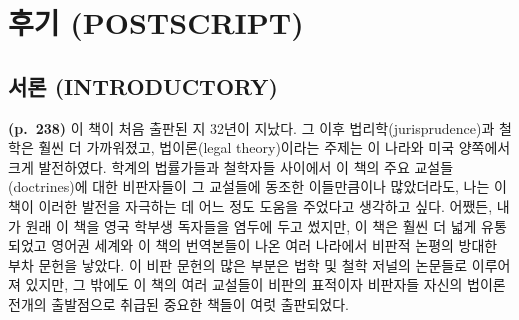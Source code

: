 \section{후기 (POSTSCRIPT)}\label{uxd6c4uxae30-postscript}

\subsection{서론 (INTRODUCTORY)}\label{uxc11cuxb860-introductory}

\textbf{(p.~238)} 이 책이 처음 출판된 지 32년이 지났다. 그 이후
법리학(jurisprudence)과 철학은 훨씬 더 가까워졌고, 법이론(legal
theory)이라는 주제는 이 나라와 미국 양쪽에서 크게 발전하였다. 학계의
법률가들과 철학자들 사이에서 이 책의 주요 교설들(doctrines)에 대한
비판자들이 그 교설들에 동조한 이들만큼이나 많았더라도, 나는 이 책이
이러한 발전을 자극하는 데 어느 정도 도움을 주었다고 생각하고 싶다.
어쨌든, 내가 원래 이 책을 영국 학부생 독자들을 염두에 두고 썼지만, 이
책은 훨씬 더 넓게 유통되었고 영어권 세계와 이 책의 번역본들이 나온 여러
나라에서 비판적 논평의 방대한 부차 문헌을 낳았다. 이 비판 문헌의 많은
부분은 법학 및 철학 저널의 논문들로 이루어져 있지만, 그 밖에도 이 책의
여러 교설들이 비판의 표적이자 비판자들 자신의 법이론 전개의 출발점으로
취급된 중요한 책들이 여럿 출판되었다.

